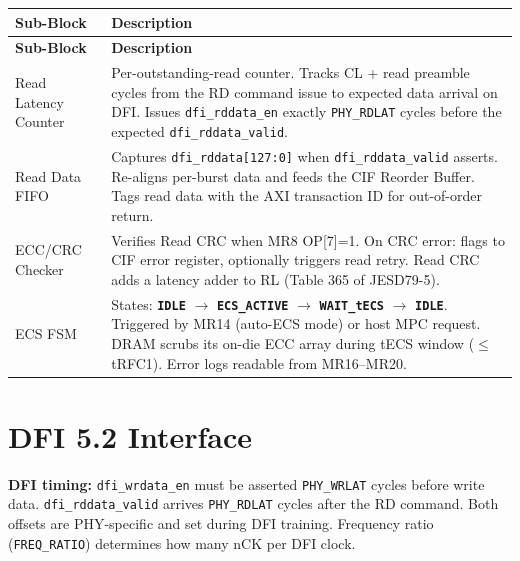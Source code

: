 \documentclass[11pt,a4paper]{article}
\newcommand{\reg}[1]{\textcolor{ddrpurple}{\texttt{#1}}}
\newcommand{\sig}[1]{\textcolor{ddrteal}{\texttt{#1}}}
\newcommand{\state}[1]{\textcolor{ddrblue}{\textbf{\texttt{#1}}}}
\begin{document}
\begin{longtable}{L{3.6cm} L{10.9cm}}
\toprule
\textbf{Sub-Block} & \textbf{Description} \\
\midrule
\endfirsthead\toprule\textbf{Sub-Block}&\textbf{Description}\\\midrule\endhead
\bottomrule\endfoot

Read Latency Counter
  & Per-outstanding-read counter. Tracks CL + read preamble cycles from
    the RD command issue to expected data arrival on DFI.
    Issues \sig{dfi\_rddata\_en} exactly \reg{PHY\_RDLAT} cycles before
    the expected \sig{dfi\_rddata\_valid}. \\
Read Data FIFO
  & Captures \sig{dfi\_rddata[127:0]} when \sig{dfi\_rddata\_valid} asserts.
    Re-aligns per-burst data and feeds the CIF Reorder Buffer.
    Tags read data with the AXI transaction ID for out-of-order return. \\
ECC/CRC Checker
  & Verifies Read CRC when MR8 OP[7]=1.
    On CRC error: flags to CIF error register, optionally triggers read
    retry. Read CRC adds a latency adder to RL (Table 365 of JESD79-5). \\
ECS FSM
  & States: \state{IDLE} $\to$ \state{ECS\_ACTIVE} $\to$
    \state{WAIT\_tECS} $\to$ \state{IDLE}.
    Triggered by MR14 (auto-ECS mode) or host MPC request.
    DRAM scrubs its on-die ECC array during tECS window ($\leq$ tRFC1).
    Error logs readable from MR16--MR20. \\
\end{longtable}

\section{DFI 5.2 Interface}

\begin{notebox}
\textbf{DFI timing:} \sig{dfi\_wrdata\_en} must be asserted \reg{PHY\_WRLAT} cycles
before write data. \sig{dfi\_rddata\_valid} arrives \reg{PHY\_RDLAT} cycles after
the RD command. Both offsets are PHY-specific and set during DFI training.
Frequency ratio (\reg{FREQ\_RATIO}) determines how many nCK per DFI clock.
\end{notebox}
\end{document}
